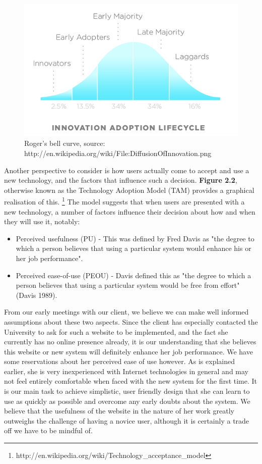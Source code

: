 \documentclass{l3proj}
\begin{document}
\begin{figure}
\begin{center}
\includegraphics[scale=0.6]{DiffusionOfInnovation}
\caption{Roger's bell curve, source: http://en.wikipedia.org/wiki/File:DiffusionOfInnovation.png}
\end{center}
\end{figure}

Another perspective to consider is how users actually come to accept and use a
new technology, and the factors that influence such a decision. \textbf{Figure
2.2}, otherwise known as the Technology Adoption Model (TAM) provides a
graphical realisation of this.
\footnote{http://en.wikipedia.org/wiki/Technology\_acceptance\_model} The model
suggests that when users are presented with a new technology, a number of
factors influence their decision about how and when they will use it, notably:

\begin{itemize}
\item Perceived usefulness (PU) - This was defined by Fred Davis as "the degree
to which a person believes that using a particular system would enhance his or
her job performance".
\item Perceived ease-of-use (PEOU) - Davis defined this as "the degree to which
a person believes that using a particular system would be free from effort"
(Davis 1989).	
\end{itemize}

From our early meetings with our client, we believe we can make well informed
assumptions about these two aspects. Since the client has especially contacted
the University to ask for such a website to be implemented, and the fact she
currently has no online presence already, it is our understanding that she
believes this website or new system will definitely enhance her job performance.
We have some reservations about her perceived ease of use however. As is
explained earlier, she is very inexperienced with Internet technologies in
general and may not feel entirely comfortable when faced with the new system for
the first time. It is our main task to achieve simplistic, user friendly design
that she can learn to use as quickly as possible and overcome any early doubts
about the system. We believe that the usefulness of the website in the nature of
her work greatly outweighs the challenge of having a novice user, although it is
certainly a trade off we have to be mindful of. 
\end{document}
